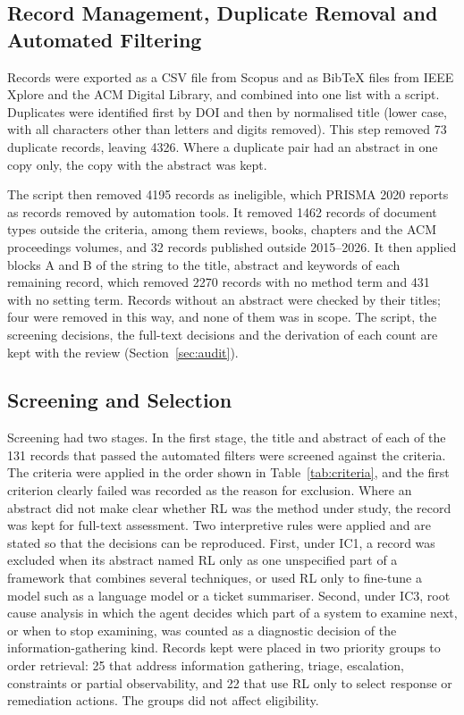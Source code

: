 \documentclass[pdflatex,sn-basic]{sn-jnl}
\begin{document}
\subsection{Record Management, Duplicate Removal and Automated Filtering}
\label{sec:records}

Records were exported as a CSV file from Scopus and as BibTeX files from IEEE Xplore and the ACM Digital Library, and combined into one list with a script. Duplicates were identified first by DOI and then by normalised title (lower case, with all characters other than letters and digits removed). This step removed 73 duplicate records, leaving 4326. Where a duplicate pair had an abstract in one copy only, the copy with the abstract was kept.

The script then removed 4195 records as ineligible, which PRISMA 2020 reports as records removed by automation tools. It removed 1462 records of document types outside the criteria, among them reviews, books, chapters and the ACM proceedings volumes, and 32 records published outside 2015--2026. It then applied blocks A and B of the string to the title, abstract and keywords of each remaining record, which removed 2270 records with no method term and 431 with no setting term. Records without an abstract were checked by their titles; four were removed in this way, and none of them was in scope. The script, the screening decisions, the full-text decisions and the derivation of each count are kept with the review (Section~\ref{sec:audit}).

\subsection{Screening and Selection}
\label{sec:screening}

Screening had two stages. In the first stage, the title and abstract of each of the 131 records that passed the automated filters were screened against the criteria. The criteria were applied in the order shown in Table~\ref{tab:criteria}, and the first criterion clearly failed was recorded as the reason for exclusion. Where an abstract did not make clear whether RL was the method under study, the record was kept for full-text assessment. Two interpretive rules were applied and are stated so that the decisions can be reproduced. First, under IC1, a record was excluded when its abstract named RL only as one unspecified part of a framework that combines several techniques, or used RL only to fine-tune a model such as a language model or a ticket summariser. Second, under IC3, root cause analysis in which the agent decides which part of a system to examine next, or when to stop examining, was counted as a diagnostic decision of the information-gathering kind. Records kept were placed in two priority groups to order retrieval: 25 that address information gathering, triage, escalation, constraints or partial observability, and 22 that use RL only to select response or remediation actions. The groups did not affect eligibility.
\end{document}
